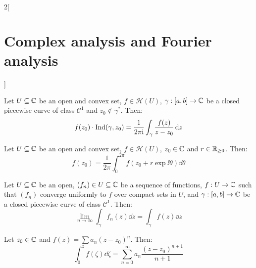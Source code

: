 \documentclass[../../../main.tex]{subfiles}
\begin{document}
\begin{multicols}{2}[\section{Complex analysis and Fourier analysis}]
\begin{theorem}
  \end{theorem}
  \begin{theorem}
    Let $U\subseteq\mathbb{C}$ be an open and convex set, $f\in\mathcal{H}(U)$, $\gamma:[a,b]\rightarrow\mathbb{C}$ be a closed piecewise curve of class $\mathcal{C}^1$ and $z_0\notin\gamma^*$. Then:
    $$f(z_0)\cdot\operatorname{Ind}(\gamma,z_0)=\frac{1}{2\pi\mathrm{i}}\int_\gamma\frac{f(z)}{z-z_0}\dd{z}$$
  \end{theorem}
  \begin{corollary}
    Let $U\subseteq\mathbb{C}$ be an open and convex set, $f\in\mathcal{H}(U)$, $z_0\in\mathbb{C}$ and $r\in\mathbb{R}_{\geq 0}$. Then:
    $$f(z_0)=\frac{1}{2\pi}\int_0^{2\pi}f(z_0+r\exp{\ii\theta})\dd{\theta}$$
  \end{corollary}
  \begin{lemma}
    Let $U\subseteq\mathbb{C}$ be an open, $(f_n)\in U\subseteq\mathbb{C}$ be a sequence of functions, $f:U\rightarrow\mathbb{C}$ such that $(f_n)$ converge uniformly to $f$ over compact sets in $U$, and $\gamma:[a,b]\rightarrow\mathbb{C}$ be a closed piecewise curve of class $\mathcal{C}^1$. Then:
    $$\lim_{n\to\infty}\int_\gamma f_n(z)\dd{z}=\int_\gamma f(z)\dd{z}$$
  \end{lemma}
  \begin{corollary}
    Let $z_0\in\mathbb{C}$ and $f(z)=\sum a_n{(z-z_0)}^n$. Then:
    $$\int_0^z f(\zeta)\dd{\zeta}=\sum_{n=0}^\infty a_n\frac{{(z-z_0)}^{n+1}}{n+1}$$
  \end{corollary}

\end{multicols}
\end{document}
